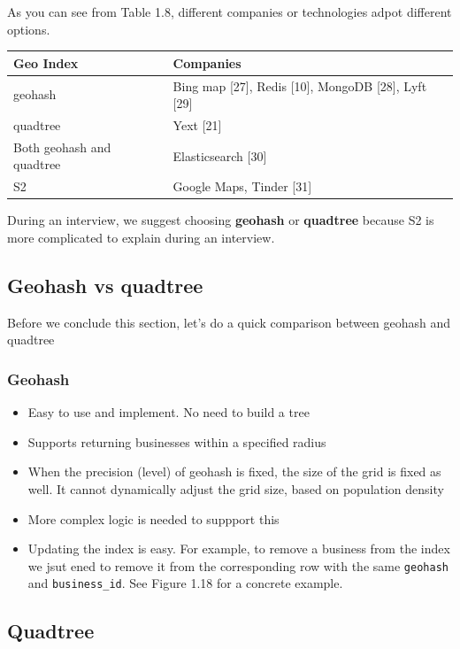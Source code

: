 \documentclass{report}
\theoremstyle{definition}
\let\oldsubsection\subsection
\let\oldsubsubsection\subsubsection
\renewcommand{\subsection}{\oldsubsection*}
\renewcommand{\subsubsection}{\oldsubsubsection*}
\begin{document}
As you can see from Table 1.8, different companies or technologies adpot different options.

\begin{tabular}{|p{6cm}|p{6cm}|}
\hline
Geo Index & Companies \\
\hline
geohash & Bing map [27], Redis [10], MongoDB [28], Lyft [29] \\
\hline
quadtree & Yext [21] \\
\hline
Both geohash and quadtree & Elasticsearch [30] \\
\hline
S2 & Google Maps, Tinder [31] \\
\hline
\end{tabular}

During an interview, we suggest choosing \textbf{geohash} or \textbf{quadtree} because S2 is more complicated to explain during an interview.

\subsection{Geohash vs quadtree}

Before we conclude this section, let's do a quick comparison between geohash and quadtree

\subsubsection{Geohash}

\begin{itemize}
\item
Easy to use and implement. No need to build a tree
\item
Supports returning businesses within a specified radius
\item
When the precision (level) of geohash is fixed, the size of the grid is fixed as well. It cannot dynamically adjust the grid size, based on population density
\item
More complex logic is needed to suppport this
\item
Updating the index is easy. For example, to remove a business from the index we jsut ened to remove it from the corresponding row with the same \lstinline|geohash| and \lstinline|business_id|. See Figure 1.18 for a concrete example.
\end{itemize}

\subsection{Quadtree}
\end{document}
